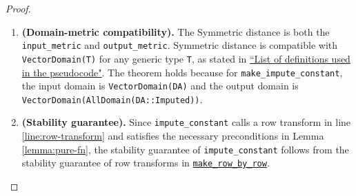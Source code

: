 \begin{proof}
\begin{enumerate}

\item \textbf{(Domain-metric compatibility).} The Symmetric distance is both the \texttt{input\_metric} and \texttt{output\_metric}. Symmetric distance is compatible with \texttt{VectorDomain(T)} for any generic type \texttt{T}, as stated in \href{https://www.overleaf.com/project/60d215bf90b337ac02200a99}{``List of definitions used in the pseudocode"}. The theorem holds because for \texttt{make\_impute\_constant}, the input domain is \texttt{VectorDomain(DA)} and the output domain is \texttt{VectorDomain(AllDomain(DA::Imputed))}. 

\item \textbf{(Stability guarantee).} Since \texttt{impute\_constant} calls a row transform in line \ref{line:row-transform} and satisfies the necessary preconditions in Lemma \ref{lemma:pure-fn}, the stability guarantee of \texttt{impute\_constant} follows from the stability guarantee of row transforms in \href{https://www.overleaf.com/2489843918kjvyyytkjfsg}{\texttt{make\_row\_by\_row}}. 

\end{enumerate}
\end{proof}


